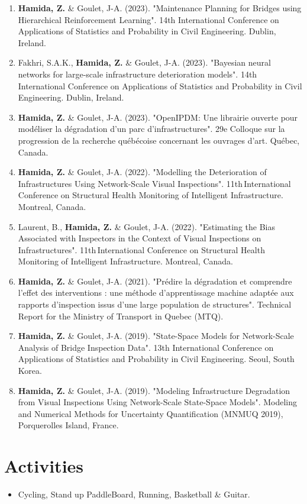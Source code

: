 \documentclass[10pt]{article}
\begin{document}
\begin{enumerate}
\item \textbf{Hamida, Z.} \& Goulet, J-A. (2023). "Maintenance Planning for Bridges using Hierarchical Reinforcement Learning". 14th International Conference on Applications of Statistics and Probability in Civil Engineering. Dublin, Ireland.
\item Fakhri, S.A.K., \textbf{Hamida, Z.} \& Goulet, J-A. (2023). "Bayesian neural networks for large-scale infrastructure deterioration models". 14th International Conference on Applications of Statistics and Probability in Civil Engineering. Dublin, Ireland.
\item \textbf{Hamida, Z.} \& Goulet, J-A. (2023). "OpenIPDM: Une librairie ouverte pour mod\'eliser la d\'egradation d'un parc d'infrastructures". 29e Colloque sur la progression de la recherche qu\'eb\'ecoise concernant les ouvrages d'art. Qu\'ebec, Canada.
\item \textbf{Hamida, Z.} \& Goulet, J-A. (2022). "Modelling the Deterioration of Infrastructures Using Network-Scale Visual Inspections". 11th International Conference on Structural Health Monitoring of Intelligent Infrastructure. Montreal, Canada.
\item Laurent, B., \textbf{Hamida, Z.} \& Goulet, J-A. (2022). "Estimating the Bias Associated with Inspectors in the Context of Visual Inspections on Infrastructures". 11th International Conference on Structural Health Monitoring of Intelligent Infrastructure. Montreal, Canada.
\item \textbf{Hamida, Z.} \& Goulet, J-A. (2021). "Pr\'edire la d\'egradation et comprendre l'effet des interventions : une m\'ethode d'apprentissage machine adapt\'ee aux rapports d'inspection issus d'une large population de structures". Technical Report for the Ministry of Transport in Quebec (MTQ).
\item \textbf{Hamida, Z.} \& Goulet, J-A. (2019). "State-Space Models for Network-Scale Analysis of Bridge Inspection Data". 13th International Conference on Applications of Statistics and Probability in Civil Engineering. Seoul, South Korea.
\item \textbf{Hamida, Z.} \& Goulet, J-A. (2019). "Modeling Infrastructure Degradation from Visual Inspections Using Network-Scale State-Space Models". Modeling and Numerical Methods for Uncertainty Quantification (MNMUQ 2019), Porquerolles Island, France. 
\end{enumerate}

\section{Activities}
\begin{itemize}
\item Cycling, Stand up PaddleBoard, Running, Basketball \& Guitar.
\end{itemize}
\end{document}
